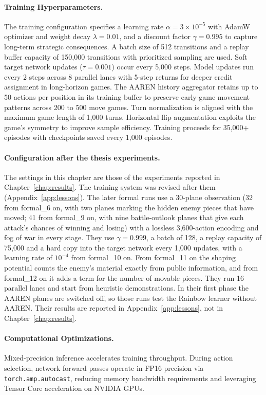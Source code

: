 \paragraph{Training Hyperparameters.}
The training configuration specifies a learning rate $\alpha = 3 \times 10^{-5}$ with AdamW optimizer and weight decay $\lambda = 0.01$, and a discount factor $\gamma = 0.995$ to capture long-term strategic consequences. A batch size of 512 transitions and a replay buffer capacity of 150,000 transitions with prioritized sampling are used. Soft target network updates ($\tau = 0.001$) occur every 5,000 steps. Model updates run every 2 steps across 8 parallel lanes with 5-step returns for deeper credit assignment in long-horizon games. The AAREN history aggregator retains up to 50 actions per position in its training buffer to preserve early-game movement patterns across 200 to 500 move games. Turn normalization is aligned with the maximum game length of 1,000 turns. Horizontal flip augmentation exploits the game's symmetry to improve sample efficiency. Training proceeds for 35,000+ episodes with checkpoints saved every 1,000 episodes.

\paragraph{Configuration after the thesis experiments.} The settings in this chapter are those of the experiments reported in Chapter~\ref{chap:results}. The training system was revised after them (Appendix~\ref{app:lessons}). The later formal runs use a 30-plane observation (32 from formal\_6 on, with two planes marking the hidden enemy pieces that have moved; 41 from formal\_9 on, with nine battle-outlook planes that give each attack's chances of winning and losing) with a lossless 3,600-action encoding and fog of war in every stage. They use $\gamma = 0.999$, a batch of 128, a replay capacity of 75,000 and a hard copy into the target network every 1,000 updates, with a learning rate of $10^{-4}$ from formal\_10 on. From formal\_11 on the shaping potential counts the enemy's material exactly from public information, and from formal\_12 on it adds a term for the number of movable pieces. They run 16 parallel lanes and start from heuristic demonstrations. In their first phase the AAREN planes are switched off, so those runs test the Rainbow learner without AAREN. Their results are reported in Appendix~\ref{app:lessons}, not in Chapter~\ref{chap:results}.

\paragraph{Computational Optimizations.}
Mixed-precision inference accelerates training throughput. During action selection, network forward passes operate in FP16 precision via \texttt{torch.amp.autocast}, reducing memory bandwidth requirements and leveraging Tensor Core acceleration on NVIDIA GPUs.

